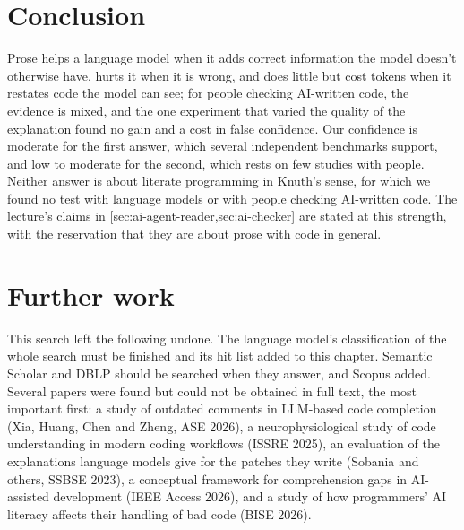 \section{Conclusion}
\label{sec:ai-rq23-conclusion}

Prose helps a language model when it adds correct information the model doesn't
otherwise have, hurts it when it is wrong, and does little but cost tokens when
it restates code the model can see; for people checking AI-written code, the
evidence is mixed, and the one experiment that varied the quality of the
explanation found no gain and a cost in false confidence.
Our confidence is moderate for the first answer, which several independent
benchmarks support, and low to moderate for the second, which rests on few
studies with people.
Neither answer is about literate programming in Knuth's sense, for which we
found no test with language models or with people checking AI-written code.
The lecture's claims in \cref{sec:ai-agent-reader,sec:ai-checker} are stated at
this strength, with the reservation that they are about prose with code in
general.

\section{Further work}
\label{sec:ai-rq23-further}

This search left the following undone.
The language model's classification of the whole search must be finished and
its hit list added to this chapter.
Semantic Scholar and DBLP should be searched when they answer, and Scopus
added.
Several papers were found but could not be obtained in full text, the most
important first: a study of outdated comments in LLM-based code completion
(Xia, Huang, Chen and Zheng, ASE 2026), a neurophysiological study of code
understanding in modern coding workflows (ISSRE 2025), an evaluation of the
explanations language models give for the patches they write (Sobania and
others, SSBSE 2023), a conceptual framework for comprehension gaps in
AI-assisted development (IEEE Access 2026), and a study of how programmers' AI
literacy affects their handling of bad code (BISE 2026).

